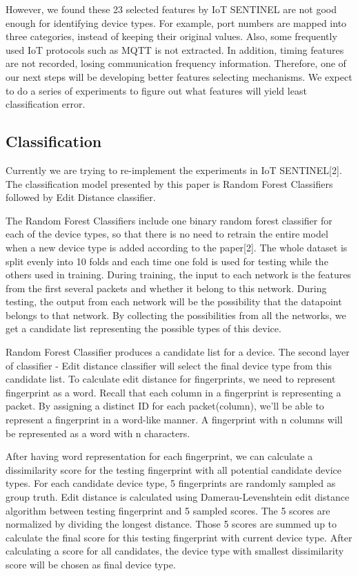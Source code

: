 \documentclass[twocolumn,10pt]{article}
\begin{document}
However, we found these 23 selected features by IoT SENTINEL are not good enough for identifying device types. For example, port numbers are mapped into three categories, instead of keeping their original values. Also, some frequently used IoT protocols such as MQTT is not extracted. In addition, timing features are not recorded, losing communication frequency information. Therefore, one of our next steps will be developing better features selecting mechanisms. We expect to do a series of experiments to figure out what features will yield least classification error.

\subsection{Classification}
Currently we are trying to re-implement the experiments in IoT SENTINEL[2]. The classification model presented by this paper is Random Forest Classifiers followed by Edit Distance classifier. 

The Random Forest Classifiers include one binary random forest classifier for each of the device types, so that there is no need to retrain the entire model when a new device type is added according to the paper[2]. The whole dataset is split evenly into 10 folds and each time one fold is used for testing while the others used in training. During training, the input to each network is the features from the first several packets and whether it belong to this network. During testing, the output from each network will be the possibility that the datapoint belongs to that network. By collecting the possibilities from all the networks, we get a candidate list representing the possible types of this device.

Random Forest Classifier produces a candidate list for a device. The second layer of classifier - Edit distance classifier will select the final device type from this candidate list. To calculate edit distance for fingerprints, we need to represent fingerprint as a word. Recall that each column in a fingerprint is representing a packet. By assigning a distinct ID for each packet(column), we’ll be able to represent a fingerprint in a word-like manner. A fingerprint with n columns will be represented as a word with n characters.

After having word representation for each fingerprint, we can calculate a dissimilarity score for the testing fingerprint with all potential candidate device types. For each candidate device type, 5 fingerprints are randomly sampled as group truth. Edit distance is calculated using Damerau-Levenshtein edit distance algorithm between testing fingerprint and 5 sampled scores. The 5 scores are normalized by dividing the longest distance. Those 5 scores are summed up to calculate the final score for this testing fingerprint with current device type. After calculating a score for all candidates, the device type with smallest dissimilarity score will be chosen as final device type.
\end{document}
